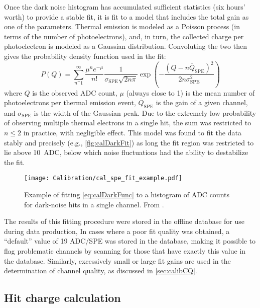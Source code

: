 \documentclass[../thesis.tex]{subfiles}
\begin{document}
Once the dark noise histogram has accumulated sufficient statistics (six hours' worth) to provide a stable fit, it is fit to a model that includes the total gain as one of the parameters. Thermal emission is modeled as a Poisson process (in terms of the number of photoelectrons), and, in turn, the collected charge per photoelectron is modeled as a Gaussian distribution. Convoluting the two then gives the probability density function used in the fit:
\begin{equation}
  \label{eq:calDarkFunc}
  P(Q) = \sum_{n^=1}^{\infty} \frac{\mu^n e^{-\mu}}{n!} \frac{1}{\sigma_{\mathrm{SPE}}\sqrt{2n\pi}} \exp\left(-\frac{(Q - n\overline Q_{\mathrm{SPE}})^2}{2n\sigma_{\mathrm{SPE}}^2}\right)
\end{equation}
where $Q$ is the observed ADC count, $\mu$ (always close to 1) is the mean number of photoelectrons per thermal emission event, $\overline Q_{\mathrm{SPE}}$ is the gain of a given channel, and $\sigma_{\mathrm{SPE}}$ is the width of the Gaussian peak. Due to the extremely low probability of observing multiple thermal electrons in a single hit, the sum was restricted to $n \le 2$ in practice, with negligible effect. This model was found to fit the data stably and precisely (e.g., \autoref{fig:calDarkFit}) as long the fit region was restricted to lie above 10~ADC, below which noise fluctuations had the ability to destabilize the fit.

\begin{figure}[ht]
  \texttt{[image: Calibration/cal\_spe\_fit\_example.pdf]}
  \caption{Example of fitting \autoref{eq:calDarkFunc} to a histogram of ADC counts for dark-noise hits in a single channel. From \cite{An_2017}.}
  \label{fig:calDarkFit}
\end{figure}

The results of this fitting procedure were stored in the offline database for use during data production, In cases where a poor fit quality was obtained, a ``default'' value of 19 ADC/SPE was stored in the database, making it possible to flag problematic channels by scanning for those that have exactly this value in the database. Similarly, excessively small or large fit gains are used in the determination of channel quality, as discussed in \autoref{sec:calibCQ}.

\subsection{Hit charge calculation}
\label{sec:calibHitCharge}
\end{document}
